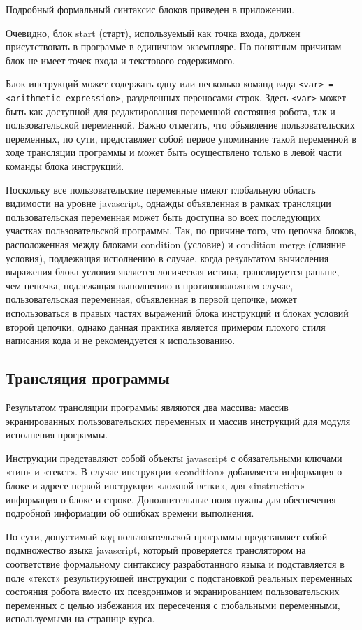 Подробный формальный синтаксис блоков приведен в приложении.

Очевидно, блок start (старт), используемый как точка входа, должен присутствовать в программе в единичном экземпляре. По понятным причинам блок не имеет точек входа и текстового содержимого.

Блок инструкций может содержать одну или несколько команд вида \lstinline|<var> = <arithmetic expression>|, разделенных переносами строк. Здесь \lstinline|<var>| может быть как доступной для редактирования переменной состояния робота, так и пользовательской переменной. Важно отметить, что объявление пользовательских переменных, по сути, представляет собой первое упоминание такой переменной в ходе трансляции программы и может быть осуществлено только в левой части команды блока инструкций.

Поскольку все пользовательские переменные имеют глобальную область видимости на уровне javascript, однажды объявленная в рамках трансляции пользовательская переменная может быть доступна во всех последующих участках пользовательской программы. Так, по причине того, что цепочка блоков, расположенная между блоками condition (условие) и condition merge (слияние условия), подлежащая исполнению в случае, когда результатом вычисления выражения блока условия является логическая истина, транслируется раньше, чем цепочка, подлежащая выполнению в противоположном случае, пользовательская переменная, объявленная в первой цепочке, может использоваться в правых частях выражений блока инструкций и блоках условий второй цепочки, однако данная практика является примером плохого стиля написания кода и не рекомендуется к использованию.  

\subsection{Трансляция программы}

Результатом трансляции программы являются два массива: массив экранированных пользовательских переменных и массив инструкций для модуля исполнения программы.

Инструкции представляют собой объекты javascript с обязательными ключами «тип» и «текст». В случае инструкции «condition» добавляется информация о блоке и адресе первой инструкции «ложной ветки», для «instruction» — информация о блоке и строке. Дополнительные поля нужны для обеспечения подробной информации об ошибках времени выполнения.

По сути, допустимый код пользовательской программы представляет собой подмножество языка javascript, который проверяется транслятором на соответствие формальному синтаксису разработанного языка и подставляется в поле «текст» результирующей инструкции с подстановкой реальных переменных состояния робота вместо их псевдонимов и экранированием пользовательских переменных с целью избежания их пересечения с глобальными переменными, используемыми на странице курса.

